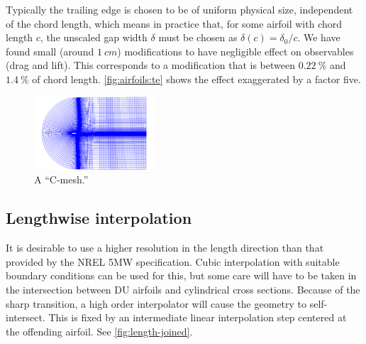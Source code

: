 \documentclass[3p,times,procedia]{elsarticle}
\begin{document}
Typically the trailing edge is chosen to be of uniform physical size,
independent of the chord length, which means in practice that, for some airfoil
with chord length $c$, the unscaled gap width $\delta$ must be chosen as
$\delta(c) = \delta_0/c$. We have found small (around $\SI{1}{cm}$)
modifications to have negligible effect on observables (drag and lift). This
corresponds to a modification that is between $\SI{0.22}{\percent}$ and
$\SI{1.4}{\percent}$ of chord length. \autoref{fig:airfoils:te} shows the effect
exaggerated by a factor five.

\begin{figure}
  \centering
  \includegraphics[width=0.4\textwidth]{figs/Sec41_a8_mesh}
  \caption{A ``C-mesh.''}
  \label{fig:cmesh}
\end{figure}

\subsection{Lengthwise interpolation}

It is desirable to use a higher resolution in the length direction than that
provided by the NREL 5MW specification. Cubic interpolation with suitable
boundary conditions can be used for this, but some care will have to be taken in
the intersection between DU airfoils and cylindrical cross sections. Because of
the sharp transition, a high order interpolator will cause the geometry to
self-intersect. This is fixed by an intermediate linear interpolation step
centered at the offending airfoil. See \autoref{fig:length-joined}.
\end{document}

